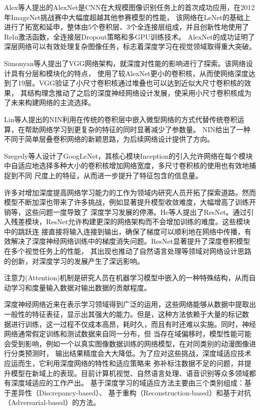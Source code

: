 Alex等人\cite{krizhevsky2012imagenet}提出的AlexNet是CNN在大规模图像识别任务上的首次成功应用，在2012年ImageNet挑战赛中大幅度超越其他参赛模型的性能，
该网络在LeNet的基础上进行了拓宽和延申，整体由5个卷积层、3个全连接层组成，并且创新性地使用了Relu激活函数，全连接层Dropout策略和多GPU训练技术。
AlexNet的成功证明了深层网络可以有效处理复杂图像任务，标志着深度学习在视觉领域取得重大突破。

Simonyan等人\cite{simonyan2014very}提出了VGG网络架构，就深度对性能的影响进行了探索。该网络设计具有分层和模块化的特点，
使用了较AlexNet更小的卷积核，从而使网络深度达到了19层。VGG验证了小尺寸卷积核通过堆叠也可以达到近似大尺寸卷积核的效果，
其结构理念推动了之后的深度神经网络设计发展，使采用小尺寸卷积核成为了未来构建网络的主流选择。

Lin等人\cite{lin2013network}提出的NIN利用在传统的卷积层中嵌入微型网络的方式代替传统卷积运算，在帮助网络学习到更复杂的特征的同时显著减少了参数量。
NIN给出了一种不同于简单层叠卷积网络的新颖思路，为后续网络设计提供了方向。

Szegedy等人\cite{szegedy2015going}设计了GoogLeNet，其核心模块Inception的引入允许网络在每个模块中自适应地选择多种大小的卷积核增加网络宽度，多尺寸卷积核的使用也有效地捕捉到不同
尺度上的特征，从而进一步提升了特征包含的信息量。

许多对增加深度提高网络学习能力的工作为领域内研究人员开拓了探索道路。然而模型不断加深也带来了许多挑战，例如显著提升模型收敛难度，大幅增高了训练开销等，这些问题一度导致了
深度学习发展的停滞。He等人\cite{he2016deep}提出了ResNet。通过引入残差模块，ResNet允许构建更深的网络架构而不会增加训练的难度。这些模块中的跳跃连
接直接将输入连接到输出，确保了梯度可以顺利地在网络中传播，有效解决了深度神经网络训练中的梯度消失问题。ResNet显著提升了深度卷积模型在多个视觉任务上的性能，
其出现也推动了自然语言处理等领域对网络设计思路的创新，对深度学习的发展产生了深远影响。

注意力(Attention)机制是研究人员在机器学习模型中嵌入的一种特殊结构，从而自动学习和度量输入数据对输出数据的贡献程度。

深度神经网络近来在表示学习领域得到广泛的运用，这些网络能够从数据中提取出一般性的特征表征，显示出其强大的能力。但是，这种方法依赖于大量的标记数
据进行训练，这一过程不仅成本高昂，耗时久，而且有时还难以实施。同时，神经网络通常假定训练和测试数据来自同一分布，但
当存在域偏移时，模型性能可能会受到影响\cite{farahani2021brief}，例如一个以真实图像数据训练的网络模型，在对同类别的动漫图像进行分类预测时，
输出结果精度会大大降低。为了应对这些挑战，深度域适应技术应运而生，它利用深度网络的特性和适应策略来
弥补标注数据不足的问题，并提升模型在新域上的表现。目前计算机视觉\cite{chen2018domain}、自然语言处理\cite{guo2020multi}、语音识别\cite{sun2017unsupervised}等众多领域都有深度域适应的工作产出。
基于深度学习的域适应方法主要由三个类别组成：基于差异性（Discrepancy-based）、
基于重构（Reconstruction-based）和基于对抗（Adversarial-based）的方法。

